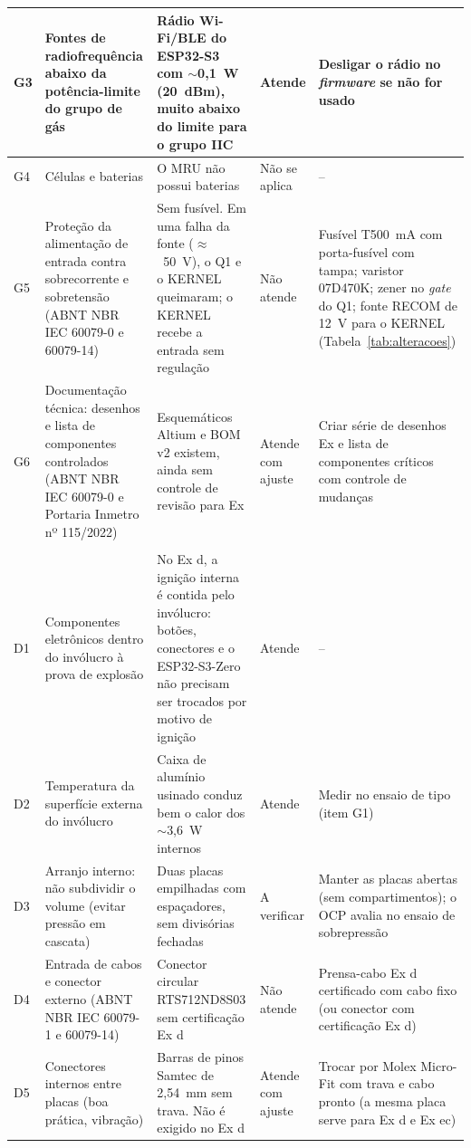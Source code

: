 \documentclass[a4paper, 12pt]{article}
\newcommand{\avA}{\cellcolor{green!20}Atende}
\newcommand{\avJ}{\cellcolor{yellow!30}Atende com ajuste}
\newcommand{\avN}{\cellcolor{red!20}Não atende}
\newcommand{\avV}{\cellcolor{gray!20}A verificar}
\newcommand{\avNA}{\cellcolor{gray!20}Não se aplica}
\begin{document}
{\begin{longtable}{|>{\centering\arraybackslash}p{0.6cm}|>{\raggedright\arraybackslash}p{2.8cm}|>{\raggedright\arraybackslash}p{4.0cm}|>{\raggedright\arraybackslash}p{1.7cm}|>{\raggedright\arraybackslash}p{4.2cm}|}
    G3 & Fontes de radiofrequência abaixo da potência-limite do grupo de gás & Rádio Wi-Fi/BLE do ESP32-S3 com $\sim$0,1~W (20~dBm), muito abaixo do limite para o grupo IIC & \avA & Desligar o rádio no \textit{firmware} se não for usado \\ \hline
    G4 & Células e baterias & O MRU não possui baterias & \avNA & -- \\ \hline
    G5 & Proteção da alimentação de entrada contra sobrecorrente e sobretensão (ABNT NBR IEC 60079-0 e 60079-14) & Sem fusível. Em uma falha da fonte ($\approx$~50~V), o Q1 e o KERNEL queimaram; o KERNEL recebe a entrada sem regulação & \avN & Fusível T500~mA com porta-fusível com tampa; varistor 07D470K; zener no \textit{gate} do Q1; fonte RECOM de 12~V para o KERNEL (Tabela~\ref{tab:alteracoes}) \\ \hline
    G6 & Documentação técnica: desenhos e lista de componentes controlados (ABNT NBR IEC 60079-0 e Portaria Inmetro nº 115/2022) & Esquemáticos Altium e BOM v2 existem, ainda sem controle de revisão para Ex & \avJ & Criar série de desenhos Ex e lista de componentes críticos com controle de mudanças \\ \hline
    \multicolumn{5}{|l|}{\textbf{Requisitos específicos do Ex d --- ABNT NBR IEC 60079-1}} \\ \hline
    D1 & Componentes eletrônicos dentro do invólucro à prova de explosão & No Ex d, a ignição interna é contida pelo invólucro: botões, conectores e o ESP32-S3-Zero não precisam ser trocados por motivo de ignição & \avA & -- \\ \hline
    D2 & Temperatura da superfície externa do invólucro & Caixa de alumínio usinado conduz bem o calor dos $\sim$3,6~W internos & \avA & Medir no ensaio de tipo (item G1) \\ \hline
    D3 & Arranjo interno: não subdividir o volume (evitar pressão em cascata) & Duas placas empilhadas com espaçadores, sem divisórias fechadas & \avV & Manter as placas abertas (sem compartimentos); o OCP avalia no ensaio de sobrepressão \\ \hline
    D4 & Entrada de cabos e conector externo (ABNT NBR IEC 60079-1 e 60079-14) & Conector circular RTS712ND8S03 sem certificação Ex d & \avN & Prensa-cabo Ex d certificado com cabo fixo (ou conector com certificação Ex d) \\ \hline
    D5 & Conectores internos entre placas (boa prática, vibração) & Barras de pinos Samtec de 2,54~mm sem trava. Não é exigido no Ex d & \avJ & Trocar por Molex Micro-Fit com trava e cabo pronto (a mesma placa serve para Ex d e Ex ec) \\ \hline

\end{longtable}}
\end{document}
